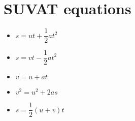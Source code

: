 \section{SUVAT equations}
\begin{itemize}
    \item $s=ut+\dfrac{1}{2}at^2$
    \item $s=vt-\dfrac{1}{2}at^2$
    \item $v=u+at$
    \item $v^2=u^2+2as$
    \item $s=\dfrac{1}{2}(u+v)t$
\end{itemize}
